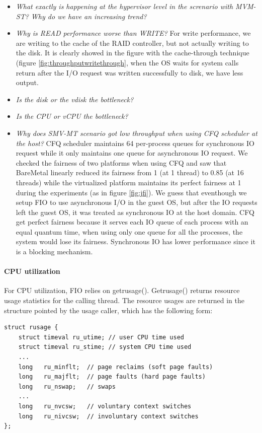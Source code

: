 \documentclass{acmsig}
\begin{document}
\begin{itemize}
 \item \textit{What exactly is happening at the hypervisor level in the screnario with MVM-ST? Why do we have an increasing trend?}
 \item \textit{Why is READ performance worse than WRITE?} For write performance, we are writing to the cache of the RAID controller, but not actually writing to the disk. It is clearly showed in the figure with the cache-through technique (figure \ref{fig:throughputwritethrough}, when the OS waits for system calls return after the I/O request was written successfully to disk, we have less output.
 \item \textit{Is the disk or the vdisk the bottleneck?} %
 \item \textit{Is the CPU or vCPU the bottleneck?}    
 \item \textit{Why does SMV-MT scenario got low throughput when using CFQ scheduler at the host?} CFQ scheduler maintains 64 per-process queues for synchronous IO request while it only maintains one queue for asynchronous IO request. We checked the fairness of two platforms when using CFQ and saw that BareMetal linearly reduced its fairness from 1 (at 1 thread) to 0.85 (at 16 threads) while the virtualized platform maintains its perfect fairness at 1 during the experiments (as in figure \ref{fig:jfi}). We guess that eventhough we setup FIO to use asynchronous I/O in the guest OS, but after the IO requests left the guest OS, it was treated as synchronous IO at the host domain. CFQ get perfect fairness because it serves each IO queue of each process with an equal quantum time, when using only one queue for all the processes, the system would lose its fairness. Synchronous IO has lower performance since it is a blocking mechanism.
\end{itemize}


\paragraph{CPU utilization}

For CPU utilization, FIO relies on getrusage(). Getrusage() returns resource usage statistics for the calling thread. The resource usages are returned in the structure pointed by the usage caller, which has the following form:

\begin{lstlisting}
struct rusage {
    struct timeval ru_utime; // user CPU time used
    struct timeval ru_stime; // system CPU time used
    ...
    long   ru_minflt;  // page reclaims (soft page faults)
    long   ru_majflt;  // page faults (hard page faults)
    long   ru_nswap;   // swaps
    ...
    long   ru_nvcsw;   // voluntary context switches
    long   ru_nivcsw;  // involuntary context switches
};
\end{lstlisting}
\end{document}
